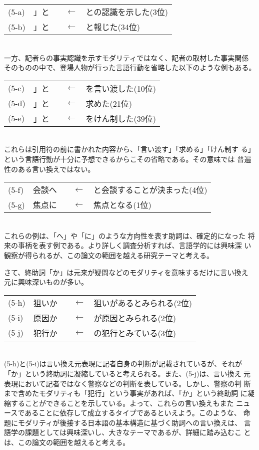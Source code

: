 \documentclass[jnlpbbl]{jnlp_j}
\begin{document}
\begin{tabular}{llcl}
(5-a) & 」と　 & $\leftarrow$ &  との認識を示した(3位) \\
(5-b) & 」と　 & $\leftarrow$ &  と報じた(34位)
\end{tabular}
\\

一方、記者らの事実認識を示すモダリティではなく、記者の取材した事実関係
そのものの中で、登場人物が行った言語行動を省略した以下のような例もある。
\\

\begin{tabular}{llcl}
(5-c) & 」と　 & $\leftarrow$ &  を言い渡した(10位) \\
(5-d) & 」と　 & $\leftarrow$ &  求めた(21位) \\
(5-e) & 」と　 & $\leftarrow$ &  をけん制した(39位)
\end{tabular}
\\

これらは引用符の前に書かれた内容から、「言い渡す」「求める」「けん制す
る」という言語行動が十分に予想できるからこその省略である。その意味では
普遍性のある言い換えではない。
\\

\begin{tabular}{llcl}
(5-f) & 会談へ　 & $\leftarrow$ &  と会談することが決まった(4位) \\
(5-g) & 焦点に　 & $\leftarrow$ &  焦点となる(1位)
\end{tabular}
\\

これらの例は、「へ」や「に」のような方向性を表す助詞は、確定的になった
将来の事柄を表す例である。より詳しく調査分析すれば、言語学的には興味深
い観察が得られるが、この論文の範囲を越える研究テーマと考える。

さて、終助詞「か」は元来が疑問などのモダリティを意味するだけに言い換え
元に興味深いものが多い。
\\

\begin{tabular}{llcl}
(5-h) & 狙いか  & $\leftarrow$ &  狙いがあるとみられる(2位) \\
(5-i) & 原因か　 & $\leftarrow$ &  が原因とみられる(2位) \\
(5-j) & 犯行か  & $\leftarrow$ &  の犯行とみている(3位)
\end{tabular}
\\

(5-h)と(5-i)は言い換え元表現に記者自身の判断が記載されているが、それが
「か」という終助詞に凝縮していると考えられる。また、(5-j)は、言い換え
元表現において記者ではなく警察などの判断を表している。しかし、警察の判
断まで含めたモダリティも「犯行」という事実があれば、「か」という終助詞
に凝縮することができることを示している。よって、これらの言い換えもまた
ニュースであることに依存して成立するタイプであるといえよう。このような、
命題にモダリティが後接する日本語の基本構造に基づく助詞への言い換えは、
言語学の課題としては興味深いし、大きなテーマであるが、詳細に踏み込むこ
とは、この論文の範囲を越えると考える。
\end{document}
